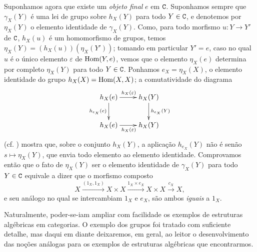 \begin{env}[8.2.7]
\label{0.8.2.7}
Suponhamos agora que existe um \emph{objeto final} $e$  em $\mathtt{C}$.
Suponhamos sempre que $\gamma_X(Y)$ é uma lei de grupo sobre $h_X(Y)$ para todo $Y\in\mathtt{C}$, e denotemos por $\eta_X(Y)$ o elemento identidade de $\gamma_X(Y)$.
Como, para todo morfismo $u:Y\to Y'$ de $\mathtt{C}$, $h_X(u)$ é um homomorfismo de grupos, temos $\eta_X(Y)=(h_X(u))(\eta_X(Y'))$; tomando em particular $Y'=e$, caso no qual $u$ é o único elemento $\varepsilon$ de $\operatorname{Hom}(Y,e)$, vemos que o elemento $\eta_X(e)$ determina por completo $\eta_X(Y)$ para todo $Y\in\mathtt{C}$.
Ponhamos $e_X=\eta_X(X)$, o elemento identidade do grupo $h_X(X)=\operatorname{Hom}(X,X)$; a comutatividade do diagrama
\[
  \xymatrix{
    h_X(e)\ar[r]^{h_X(\varepsilon)}\ar[d]_{h_{e_X}(e)} &
    h_X(Y)\ar[d]^{h_{e_X}(Y)}\\
    h_X(e)\ar[r]_{h_X(\varepsilon)} &
    h_X(Y)
  }
\]
(cf. ) mostra que, sobre o conjunto $h_X(Y)$, a aplicação $h_{e_X}(Y)$ não é senão
$s\mapsto\eta_X(Y)$, que envia todo elemento ao elemento identidade.
Comprovamos então que o fato de $\eta_X(Y)$ ser o elemento identidade de $\gamma_X(Y)$ para todo $Y\in\mathtt{C}$ equivale a dizer que o morfismo composto
\[
  X\xrightarrow{(1_X,1_X)}X\times X\xrightarrow{1_X\times e_X}X\times X\xrightarrow{c_X}X,
\]
e seu análogo no qual se intercambiam $1_X$ e $e_X$, são ambos \emph{iguais} a $1_X$.
\end{env}

\begin{env}[8.2.8]
\label{0.8.2.8}
Naturalmente, poder-se-iam ampliar com facilidade os exemplos de estruturas algébricas em categorias.
O exemplo dos grupos foi tratado com suficiente detalhe, mas daqui em diante deixaremos, em geral, ao leitor o desenvolvimento das noções análogas para os exemplos de estruturas algébricas que encontrarmos.
\end{env}
